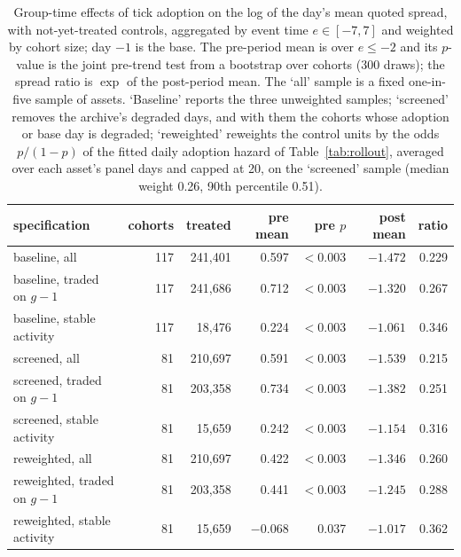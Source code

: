 \begin{table}[htbp]
\centering\scriptsize\setlength{\tabcolsep}{3.5pt}
\begin{tabular}{lrrrrrr}
\toprule
specification & cohorts & treated & pre mean & pre $p$ & post mean & ratio \\
\midrule
baseline, all & 117 & 241{,}401 & 0.597 & $<0.003$ & $-1.472$ & 0.229 \\
baseline, traded on $g-1$ & 117 & 241{,}686 & 0.712 & $<0.003$ & $-1.320$ & 0.267 \\
baseline, stable activity & 117 & 18{,}476 & 0.224 & $<0.003$ & $-1.061$ & 0.346 \\
screened, all & 81 & 210{,}697 & 0.591 & $<0.003$ & $-1.539$ & 0.215 \\
screened, traded on $g-1$ & 81 & 203{,}358 & 0.734 & $<0.003$ & $-1.382$ & 0.251 \\
screened, stable activity & 81 & 15{,}659 & 0.242 & $<0.003$ & $-1.154$ & 0.316 \\
reweighted, all & 81 & 210{,}697 & 0.422 & $<0.003$ & $-1.346$ & 0.260 \\
reweighted, traded on $g-1$ & 81 & 203{,}358 & 0.441 & $<0.003$ & $-1.245$ & 0.288 \\
reweighted, stable activity & 81 & 15{,}659 & $-0.068$ & 0.037 & $-1.017$ & 0.362 \\
\bottomrule
\end{tabular}
\caption{Group-time effects of tick adoption on the log of the day's mean quoted spread, with not-yet-treated controls, aggregated by event time $e\in[-7,7]$ and weighted by cohort size; day $-1$ is the base. The pre-period mean is over $e\le-2$ and its $p$-value is the joint pre-trend test from a bootstrap over cohorts (300 draws); the spread ratio is $\exp$ of the post-period mean. The `all' sample is a fixed one-in-five sample of assets. `Baseline' reports the three unweighted samples; `screened' removes the archive's degraded days, and with them the cohorts whose adoption or base day is degraded; `reweighted' reweights the control units by the odds $p/(1-p)$ of the fitted daily adoption hazard of Table~\ref{tab:rollout}, averaged over each asset's panel days and capped at 20, on the `screened' sample (median weight 0.26, 90th percentile 0.51).}
\label{tab:eventstudy}
\end{table}
